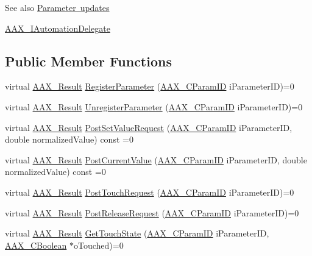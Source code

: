 \begin{DoxySeeAlso}{See also}
\mbox{\hyperlink{a00820}{Parameter updates}} 

\mbox{\hyperlink{a01773}{A\+A\+X\+\_\+\+I\+Automation\+Delegate}} 
\end{DoxySeeAlso}
\subsection*{Public Member Functions}
\begin{DoxyCompactItemize}
\item 
virtual \mbox{\hyperlink{a00392_a4d8f69a697df7f70c3a8e9b8ee130d2f}{A\+A\+X\+\_\+\+Result}} \mbox{\hyperlink{a01617_a2de166cf16da311514ab40b1871e4435}{Register\+Parameter}} (\mbox{\hyperlink{a00392_a1440c756fe5cb158b78193b2fc1780d1}{A\+A\+X\+\_\+\+C\+Param\+ID}} i\+Parameter\+ID)=0
\item 
virtual \mbox{\hyperlink{a00392_a4d8f69a697df7f70c3a8e9b8ee130d2f}{A\+A\+X\+\_\+\+Result}} \mbox{\hyperlink{a01617_a5d1ff21e71cd04f717808da4b9f83d62}{Unregister\+Parameter}} (\mbox{\hyperlink{a00392_a1440c756fe5cb158b78193b2fc1780d1}{A\+A\+X\+\_\+\+C\+Param\+ID}} i\+Parameter\+ID)=0
\item 
virtual \mbox{\hyperlink{a00392_a4d8f69a697df7f70c3a8e9b8ee130d2f}{A\+A\+X\+\_\+\+Result}} \mbox{\hyperlink{a01617_a094075c1a3ddaf01a29a024ce03aabc0}{Post\+Set\+Value\+Request}} (\mbox{\hyperlink{a00392_a1440c756fe5cb158b78193b2fc1780d1}{A\+A\+X\+\_\+\+C\+Param\+ID}} i\+Parameter\+ID, double normalized\+Value) const =0
\item 
virtual \mbox{\hyperlink{a00392_a4d8f69a697df7f70c3a8e9b8ee130d2f}{A\+A\+X\+\_\+\+Result}} \mbox{\hyperlink{a01617_ac28f4c2e24869a0e28d1a5f358683b12}{Post\+Current\+Value}} (\mbox{\hyperlink{a00392_a1440c756fe5cb158b78193b2fc1780d1}{A\+A\+X\+\_\+\+C\+Param\+ID}} i\+Parameter\+ID, double normalized\+Value) const =0
\item 
virtual \mbox{\hyperlink{a00392_a4d8f69a697df7f70c3a8e9b8ee130d2f}{A\+A\+X\+\_\+\+Result}} \mbox{\hyperlink{a01617_a6685bdc1e53f26be6e7f6d58a31d06d1}{Post\+Touch\+Request}} (\mbox{\hyperlink{a00392_a1440c756fe5cb158b78193b2fc1780d1}{A\+A\+X\+\_\+\+C\+Param\+ID}} i\+Parameter\+ID)=0
\item 
virtual \mbox{\hyperlink{a00392_a4d8f69a697df7f70c3a8e9b8ee130d2f}{A\+A\+X\+\_\+\+Result}} \mbox{\hyperlink{a01617_a192c9c9a4af9c29caa763753f59fa59a}{Post\+Release\+Request}} (\mbox{\hyperlink{a00392_a1440c756fe5cb158b78193b2fc1780d1}{A\+A\+X\+\_\+\+C\+Param\+ID}} i\+Parameter\+ID)=0
\item 
virtual \mbox{\hyperlink{a00392_a4d8f69a697df7f70c3a8e9b8ee130d2f}{A\+A\+X\+\_\+\+Result}} \mbox{\hyperlink{a01617_a6183efcf15bd190cb99c6287be007d52}{Get\+Touch\+State}} (\mbox{\hyperlink{a00392_a1440c756fe5cb158b78193b2fc1780d1}{A\+A\+X\+\_\+\+C\+Param\+ID}} i\+Parameter\+ID, \mbox{\hyperlink{a00392_aa216506530f1d19a2965931ced2b274b}{A\+A\+X\+\_\+\+C\+Boolean}} $\ast$o\+Touched)=0
\end{DoxyCompactItemize}



